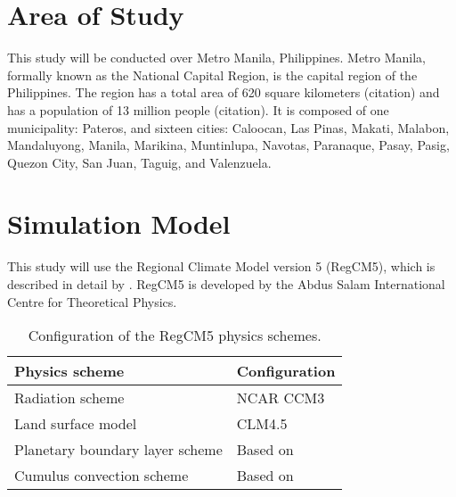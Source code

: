 \section{Area of Study}
	This study will be conducted over Metro Manila, Philippines.
	Metro Manila, formally known as the National Capital Region, is the capital region of the Philippines.
	The region has a total area of 620 square kilometers (citation)
		and has a population of 13 million people (citation).
	It is composed of one municipality: Pateros, and sixteen cities:
		Caloocan,
		Las Pinas,
		Makati,
		Malabon,
		Mandaluyong,
		Manila,
		Marikina,
		Muntinlupa,
		Navotas,
		Paranaque,
		Pasay,
		Pasig,
		Quezon City,
		San Juan,
		Taguig, and
		Valenzuela.
		
\section{Simulation Model}
	This study will use the Regional Climate Model version 5 (RegCM5), which is described in detail by \textcite{Giorgi2023}.
	RegCM5 is developed by the Abdus Salam International Centre for Theoretical Physics.
	
	\begin{table}
		\label{tab:physics-schemes}
		\caption{Configuration of the RegCM5 physics schemes.}
		\centering
		\begin{tabular}{l l}
			\hline \hline
			Physics scheme & Configuration\\
			\hline
			Radiation scheme & NCAR CCM3 \\
			Land surface model & CLM4.5 \\
			Planetary boundary layer scheme & Based on \textcite{Holtslag1990}\\
			Cumulus convection scheme & Based on \textcite{Emanuel1991}\\
			\hline
		\end{tabular}		
	\end{table}